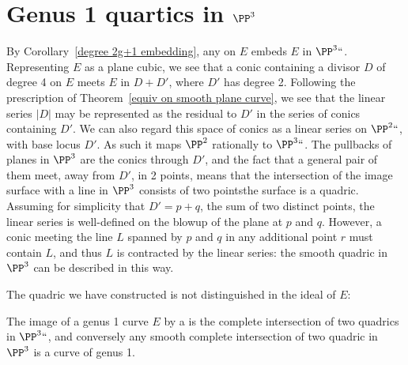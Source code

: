 \section{Genus 1 quartics in $\PP^3$} \label{g=1 in P3}

By Corollary~\ref{degree 2g+1 embedding}, any 
%
%
on
$E$ embeds $E$ in $\PP^3` `$. Representing $E$ as a plane cubic, we
see that a conic containing a divisor $D$ of degree 4 on $E$ meets $E$
in $D+D'$, where $D'$ has degree 2. 
Following the prescription 
of Theorem~\ref{equiv on smooth plane curve}, we see that the linear series $|D|$ may be represented as the residual to
$D'$ in the
series of conics containing $D'$. We can also regard this space of conics as a linear series on $\PP^2` `$, with base locus $D'$.
As such it maps $\PP^2$ rationally to $\PP^3` `$. The pullbacks of planes in $\PP^3$ are the conics through $D'$, and the fact that a general pair of them meet,
away from $D'$, in 2 points, means that the intersection of the image surface with a line in $\PP^3$ consists of two points\emdash the surface is a quadric. Assuming for simplicity that $D' = p+q$, the sum of two distinct points, the linear series is well-defined on the blowup of the plane at $p$ and $q$. However, a conic meeting the line $L$ spanned by $p$ and $q$ in any additional point $r$ must contain $L$, and thus $L$ is contracted by the linear series: the smooth quadric in $\PP^3$ can be described in this way.

The quadric we have constructed is not distinguished in the ideal of $E$:

\begin{proposition}\label{elliptic quartic as complete intersection}
 The image of a genus 1 curve $E$ by a 
%
%
 is the complete intersection of two quadrics in $\PP^3` `$, and conversely any  smooth complete intersection of two quadric
 in $\PP^3$ is a curve of
 genus 1.
\end{proposition}

